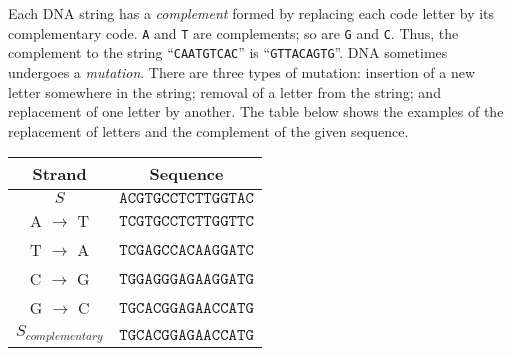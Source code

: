 Each DNA string has a {\em complement} formed by replacing each code letter by its
complementary code. {\tt A} and {\tt T} are complements; so are {\tt G} and
{\tt C}. Thus, the complement to the string ``{\tt CAATGTCAC}'' is
``{\tt GTTACAGTG}''.
DNA sometimes undergoes a {\em mutation}. There are three types of mutation:
insertion of a new letter somewhere in the string; removal of a letter from the
string; and replacement of one letter by another. The table below shows the examples of the replacement of letters and the complement of the given sequence.

\begin{center}

\begin{tabular}{|cc|}
\hline
\textbf{Strand} & \textbf{Sequence}\\
\hline\hline
$S$      & $\mathtt{ACGTGCCTCTTGGTAC}$ \\
\hline
A $\to$ T &  $\mathtt{TCGTGCCTCTTGGTTC}$ \\
T $\to$ A &  $\mathtt{TCGAGCCACAAGGATC}$ \\
C $\to$ G &  $\mathtt{TGGAGGGAGAAGGATG}$ \\
G $\to$ C &  $\mathtt{TGCACGGAGAACCATG}$ \\
\hline
$S_{complementary}$ &  $\mathtt{TGCACGGAGAACCATG}$ \\
\hline
\end{tabular}
\end{center}

